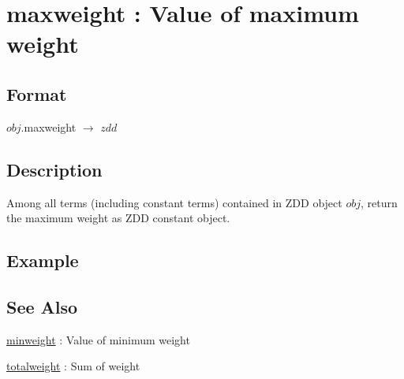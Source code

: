 
\section{maxweight : Value of maximum weight\label{sect:maxweight}}
\subsection*{Format}
$obj$.maxweight $\rightarrow$ $zdd$

\subsection*{Description}
Among all terms (including constant terms) contained in ZDD object $obj$, return the maximum weight as ZDD constant object. 

\subsection*{Example}


\subsection*{See Also}
\hyperref[sect:minweight]{minweight} : Value of minimum weight

\hyperref[sect:totalweight]{totalweight} : Sum of weight
